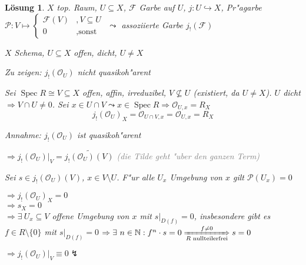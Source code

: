 \documentclass[paper = A4, fontsize=12pt, numbers=noendperiod, chapterprefix=true]{scrbook}
\theoremstyle{break}
\newtheorem{Loes}{L\"osung}
\theoremstyle{nonumberbreak}
\theoremstyle{nonumberplain}
\DeclareMathOperator{\Spec}{Spec}
\newcommand{\N}{\mathbb{N}}
\newcommand{\calF}{\mathcal{F}}
\newcommand{\calO}{\mathcal{O}}
\newcommand{\calP}{\mathcal{P}}
\begin{document}
\begin{Loes}
$X$ top. Raum, $U \subseteq X$, $\calF$ Garbe auf $U$, $j: U \hookrightarrow X$, Pr"agarbe $\calP: V \mapsto \begin{cases} \calF(V) &, V \subseteq U \\ 0 &, \text{sonst}\end{cases}$ $\leadsto$ assoziierte Garbe $j_!(\calF)$

$X$ Schema, $U \subseteq X$ offen, dicht, $U \ne X$

\emph{Zu zeigen:} $j_!(\calO_U)$ nicht quasikoh"arent

Sei $\Spec R \cong V \subseteq X$ offen, affin, irreduzibel, $V \not\subseteq U$ (existiert, da $U \ne X$). $U$ dicht $\Rightarrow V \cap U \ne 0$. Sei $x \in U \cap V \leadsto x \in \Spec R \Rightarrow \calO_{U,x} = R_X$
	\[ j_!(\calO_U)_X = \calO_{U \cap V, x} = \calO_{U,x} = R_X \]
	
\emph{Annahme:} $j_!(\calO_U)$ ist quasikoh"arent

$\Rightarrow j_!(\calO_U)|_V = \widetilde{j_!(\calO_U)(V)}$ \textcolor{gray}{(die Tilde geht "uber den ganzen Term)}

Sei $s \in j_!(\calO_U)(V)$, $x \in V \setminus U$. F"ur alle $U_x$ Umgebung von $x$ gilt $\calP(U_x) = 0$

$\Rightarrow j_!(\calO_U)_X = 0$\\
$\Rightarrow s_X = 0$\\
$\Rightarrow \exists \ U_x \subseteq V$ offene Umgebung von $x$ mit $s|_{D(f)} = 0$, insbesondere gibt es $f \in R \setminus \{0\}$ mit $s|_{D(f)} = 0$ $\Rightarrow \exists \ n \in \N: f^n\cdot s = 0 \xRightarrow[R\text{ nullteilerfrei}]{f\ne0} s = 0$

$\Longrightarrow j_!(\calO_U)|_V \equiv 0 \lightning$
\end{Loes}
\end{document}
